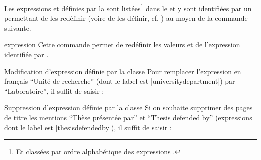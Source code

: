 Les expressions  et  définies par la \yatCl{}
sont listées\footnote{Et classées par ordre alphabétique des expressions
  .} dans le  et y sont identifiées
par un  permettant de les redéfinir (voire de les définir, cf.
) au moyen de la commande  suivante.
%
%
%
%
%
\begin{docCommand}{expression}{}
  Cette commande permet de redéfinir les valeurs  et
   de l'expression identifiée par .
\end{docCommand}
%
\bgroup
\newtoggle{YAD@firstline}
\renewcommand{\expression}[3]{%
  \iftoggle{YAD@firstline}{}{\\}%
  \global\togglefalse{YAD@firstline}%
  \ifthenelse{\isempty{#2}}{%
    \meta{vide}%
  }{%
    #2%
  }%
  &
  \ifthenelse{\isempty{#3}}{%
    \meta{vide}%
  }{%
    #3%
  }%
  &
  #1%
}
%
\small%
%
\egroup
%
\begin{dbexample}{Modification d'expression définie par la classe}{}
  Pour remplacer l'expression en français \enquote{Unit\'e de recherche} (dont le label est
  |universitydepartment|) par \enquote{Laboratoire}, il suffit de
  saisir :
\end{dbexample}
%
\begin{dbexample}{Suppression d'expression définie par la classe}{}
  Si on souhaite supprimer des pages de titre les mentions \enquote{Thèse présentée par} et \foreignquote{english}{Thesis defended by} (expressions dont le label
  est |thesisdefendedby|), il suffit de saisir :
\end{dbexample}

